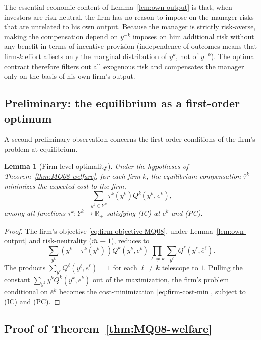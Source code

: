 \documentclass[11pt,a4paper,oneside]{book}
\def\R{\mathbb{R}}
\theoremstyle{plain}
\newtheorem{lemma}[theorem]{Lemma}
\theoremstyle{definition}
\theoremstyle{remark}
\numberwithin{equation}{chapter}
\begin{document}
The essential economic content of Lemma~\ref{lem:own-output} is that, when investors are risk-neutral, the firm has no reason to impose on the manager risks that are unrelated to his own output.
Because the manager is strictly risk-averse, making the compensation depend on $y^{-k}$ imposes on him additional risk without any benefit in terms of incentive provision (independence of outcomes means that firm-$k$ effort affects only the marginal distribution of $y^k$, not of $y^{-k}$).
The optimal contract therefore filters out all exogenous risk and compensates the manager only on the basis of his own firm's output.

\subsection{Preliminary: the equilibrium as a first-order optimum}

A second preliminary observation concerns the first-order conditions of the firm's problem at equilibrium.

\begin{lemma}[Firm-level optimality]\label{lem:firm-optimum}
Under the hypotheses of Theorem~\ref{thm:MQ08-welfare}, for each firm $k$, the equilibrium compensation $\bar{\tau}^k$ minimizes the expected cost to the firm,
\begin{equation}\label{eq:firm-cost-min}
  \sum_{y^k \in Y^k} \tau^k(y^k) Q^k(y^k, \bar{e}^k),
\end{equation}
among all functions $\tau^k : Y^k \to \R_+$ satisfying \textup{(IC)} at $\bar{e}^k$ and \textup{(PC)}.
\end{lemma}

\begin{proof}
The firm's objective \eqref{eq:firm-objective-MQ08}, under Lemma~\ref{lem:own-output} and risk-neutrality ($\bar{m} \equiv 1$), reduces to
\begin{equation*}
  \sum_{y^k} (y^k - \tau^k(y^k)) Q^k(y^k, e^k) \prod_{\ell \neq k} \sum_{y^\ell} Q^\ell(y^\ell, \bar{e}^\ell).
\end{equation*}
The products $\sum_{y^\ell} Q^\ell(y^\ell, \bar{e}^\ell) = 1$ for each $\ell \neq k$ telescope to $1$.
Pulling the constant $\sum_{y^k} y^k Q^k(y^k, \bar{e}^k)$ out of the maximization, the firm's problem conditional on $\bar{e}^k$ becomes the cost-minimization \eqref{eq:firm-cost-min}, subject to (IC) and (PC).
\end{proof}

\subsection{Proof of Theorem~\ref{thm:MQ08-welfare}}
\end{document}
